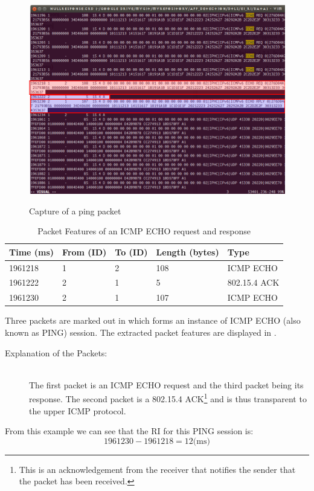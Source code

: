 \begin{example}
\begin{figure}
\centering
{
	\includegraphics[width=\textwidth,]{fig/responsetime.png}
}
\caption{Capture of a ping packet}
\label{fig: ping packet}
\end{figure}

\begin{table}[!]
\centering
\begin{tabular}{|l|l|l|l|l|}
\hline
Time (ms) & From (ID) & To (ID) & Length (bytes) & Type          \\ \hline
1961218   & 1         & 2       & 108            & ICMP ECHO \\ \hline
1961222   & 2         & 1       & 5              & 802.15.4 ACK  \\ \hline
1961230   & 2         & 1       & 107            & ICMP ECHO \\ \hline
\end{tabular}
\caption{Packet Features of an ICMP ECHO request and response}
\label{Tbl: ping}
\end{table}

Three packets are marked out in  which forms an instance of ICMP ECHO\cite{rfc1122} (also known as PING) session. The extracted packet features are displayed in .

\begin{description}
\item[Explanation of the Packets:]\hfill \\
The first packet is an ICMP ECHO request and the third packet being its response. The second packet is a 802.15.4 ACK\footnote{This is an acknowledgement from the receiver that notifies the sender that the packet has been received.} and is thus transparent to the upper ICMP protocol.
\end{description}

From this example we can see that the RI for this PING session is:
\begin{equation*}
1961230 - 1961218 = 12 \text{(ms)}
\end{equation*}

\end{example}

